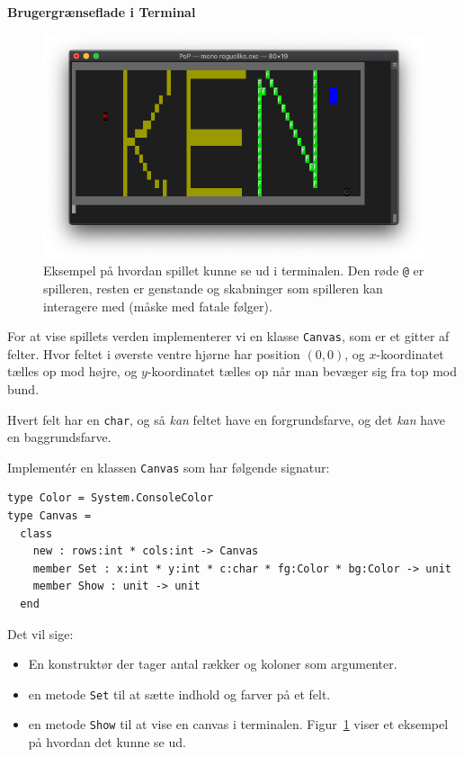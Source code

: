 \textbf{Brugergrænseflade i Terminal}
\begin{figure}[thp]\centering

  \includegraphics[width=.99\linewidth]{screenshot.png}

  \caption{Eksempel på hvordan spillet kunne se ud i terminalen. Den
    røde \texttt{@} er spilleren, resten er genstande og skabninger
    som spilleren kan interagere med (måske med fatale følger).}
  \label{fig:roguelike-screenshot}
\end{figure}

For at vise spillets verden implementerer vi en klasse
\lstinline{Canvas}, som er et gitter af felter. Hvor feltet
i øverste ventre hjørne har position $(0,0)$, og $x$-koordinatet
tælles op mod højre, og $y$-koordinatet tælles op når man bevæger sig
fra top mod bund.

Hvert felt har en \lstinline{char}, og så \emph{kan}
feltet have en forgrundsfarve, og det \emph{kan} have en baggrundsfarve.

Implementér en klassen \lstinline{Canvas} som har følgende signatur:

\begin{lstlisting}
type Color = System.ConsoleColor
type Canvas =
  class
    new : rows:int * cols:int -> Canvas
    member Set : x:int * y:int * c:char * fg:Color * bg:Color -> unit
    member Show : unit -> unit
  end
\end{lstlisting}

Det vil sige:
\begin{itemize}
\item En konstruktør der tager antal rækker og koloner som argumenter.
\item en metode \lstinline{Set} til at sætte indhold og farver på et
  felt.
\item en metode \lstinline{Show} til at vise en canvas i
  terminalen. Figur~\ref{fig:roguelike-screenshot} viser et eksempel
  på hvordan det kunne se ud.
\end{itemize}

